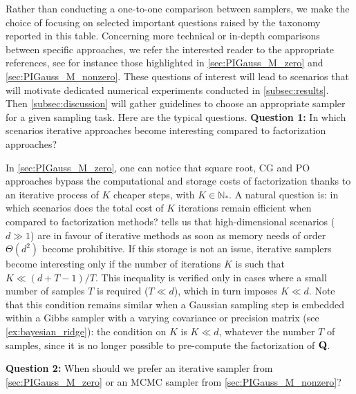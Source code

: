 \documentclass[nohypdvips,onefignum,onetabnum]{siamart171218}
\begin{document}
Rather than conducting a one-to-one comparison between samplers, we make the choice of focusing on selected important questions raised by the taxonomy reported in this table. 
Concerning more technical or in-depth comparisons between specific approaches, we refer the interested reader to the appropriate references, see for instance those highlighted in \cref{sec:PIGauss_M_zero} and \cref{sec:PIGauss_M_nonzero}.
These questions of interest will lead to scenarios that will motivate dedicated numerical experiments conducted in \cref{subsec:results}. Then \cref{subsec:discussion} will gather guidelines to choose an appropriate sampler for a given sampling task. 
Here are the typical questions.\vspace{0.25cm}
\noindent\textbf{Question 1:} In which scenarios iterative approaches become interesting compared to factorization approaches?
\vspace{0.25cm} 

In \cref{sec:PIGauss_M_zero}, one can notice that square root, CG and PO approaches bypass the computational and storage costs of factorization thanks to an iterative process of $K$ cheaper steps, with $K \in \mathbb{N}_*$.
A natural question is: in which scenarios does the total cost of $K$ iterations remain efficient when compared to factorization methods?
 tells us that high-dimensional scenarios ($d \gg 1$) are in favour of iterative methods as soon as memory needs of order $\Theta(d^2)$ become prohibitive. 
If this storage is not an issue, iterative samplers become interesting only if the number of iterations $K$ is such that $K \ll (d+T-1)/T$.
This inequality is verified only in cases where a small number of samples $T$ is required ($T \ll d$), which in turn imposes $K \ll d$. 
Note that this condition remains similar when a Gaussian sampling step is embedded within a Gibbs sampler with a varying covariance or precision matrix (see \cref{ex:bayesian_ridge}): the condition on $K$ is $K \ll d$, whatever the number $T$ of samples, since it is no longer possible to pre-compute the factorization of $\mathbf{Q}$.
\vspace{0.25cm}

\noindent\textbf{Question 2:} When should we prefer an iterative sampler from \cref{sec:PIGauss_M_zero} or an MCMC sampler from \cref{sec:PIGauss_M_nonzero}? 
\vspace{0.25cm}
\end{document}
